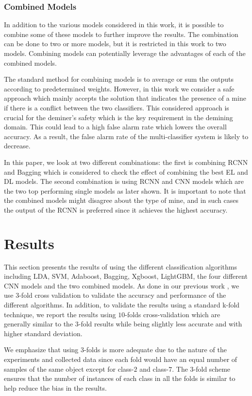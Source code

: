 \documentclass{ieeeaccess}
\begin{document}
\subsubsection*{Combined Models}
In addition to the various models considered in this work, it is possible to combine some of these models to further improve the results. The combination can be done to two or more models, but it is restricted in this work to two models. Combining models can potentially leverage the advantages of each of the combined models. 

The standard method for combining models is to average or sum the outputs according to predetermined weights. However, in this work we consider a safe approach which mainly accepts the solution that indicates the presence of a mine if there is a conflict between the two classifiers. This considered approach is crucial for the deminer's safety which is the key requirement in the demining domain. This could lead to a high false alarm rate which lowers the overall accuracy. As a result, the false alarm rate of the multi-classifier system is likely to decrease. 

In this paper, we look at two different combinations: the first is combining RCNN and Bagging which is considered to check the effect of combining the best EL and DL models. The second combination is using RCNN and CNN models which are the two top performing single models as later shown. It is important to note that the combined models might disagree about the type of mine, and in such cases the output of the RCNN is preferred since it achieves the highest accuracy.


\section{Results}
This section presents the results of using the different classification algorithms including LDA, SVM, Adaboost, Bagging, Xgboost, LightGBM, the four different CNN models and the two combined models. As done in our previous work \cite{Safatly2020}, we use $3$-fold cross validation to validate the accuracy and performance of the different algorithms. In addition, to validate the results using a standard k-fold technique, we report the results using $10$-folds cross-validation which are generally similar to the $3$-fold results while being slightly less accurate and with higher standard deviation. 

We emphasize that using $3$-folds is more adequate due to the nature of the experiments and collected data since each fold would have an equal number of samples of the same object except for class-$2$ and class-$7$. The $3$-fold scheme ensures that the number of instances of each class in all the folds is similar to help reduce the bias in the results.
\end{document}
